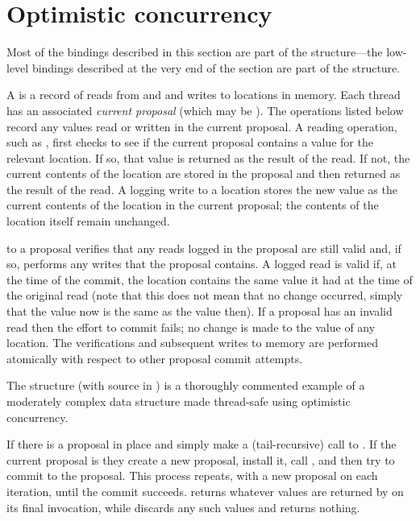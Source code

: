\section{Optimistic concurrency}
\label{sec:optimistic-concurrency}

Most of the bindings described in this section are part of the 
structure---the low-level bindings described at the very end of the
section are part of the  structure.

A  is a record of reads from and and writes to locations in
 memory.  Each thread has an associated \textit{current proposal}
 (which may be ).
The  operations listed below record any values read or
 written in the current proposal.
A reading operation, such as , first checks to
 see if the current proposal contains a value for the relevant location.
If so, that value is returned as the result of the read.
If not, the current contents of the location are stored in the proposal and
 then returned as the result of the read.
A logging write to a location stores the new value as the current contents of
 the location in the current proposal; the contents of the location itself
 remain unchanged.

 to a proposal verifies that any reads logged in
 the proposal are still valid and, if so, performs any writes that
 the proposal contains.
A logged read is valid if, at the time of the commit, the location contains
 the same value it had at the time of the original read (note that this does
 not mean that no change occurred, simply that the value now is the same as
 the value then).
If a proposal has an invalid read then the effort to commit fails; no change
 is made to the value of any location.
The verifications and subsequent writes to memory are performed atomically
 with respect to other proposal commit attempts.

The  structure (with source in )
 is a thoroughly commented example of a moderately complex data structure
 made thread-safe using optimistic concurrency.

\begin{protos}
\end{protos}
\noindent
If there is a proposal in place 
  and 
 simply make a (tail-recursive) call to .
If the current proposal is  they create a new proposal,
 install it, call , and then try to commit to the proposal.
This process repeats, with a new proposal on each iteration, until
 the commit succeeds.
 returns whatever values are returned by 
 on its final invocation, while  discards any such
 values and returns nothing.

